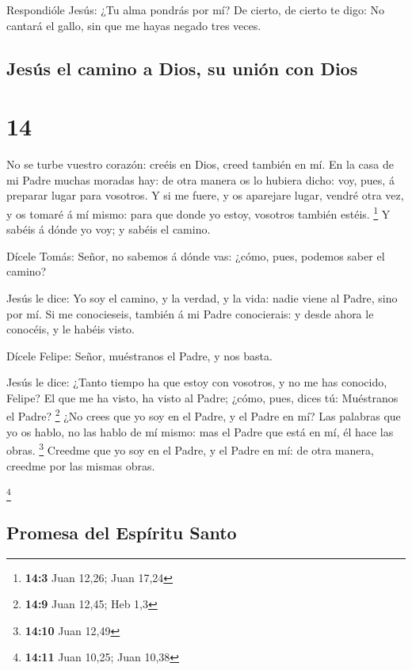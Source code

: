  Respondióle Jesús: ¿Tu alma pondrás por mí? De cierto, de
cierto te digo: No cantará el gallo, sin que me hayas negado tres veces.

\hypertarget{jesuxfas-el-camino-a-dios-su-uniuxf3n-con-dios}{%
\subsection{Jesús el camino a Dios, su unión con
Dios}\label{jesuxfas-el-camino-a-dios-su-uniuxf3n-con-dios}}

\hypertarget{section-13}{%
\section{14}\label{section-13}}

 No se turbe vuestro corazón: creéis en Dios, creed también
en mí.  En la casa de mi Padre muchas moradas hay: de otra
manera os lo hubiera dicho: voy, pues, á preparar lugar para vosotros.
 Y si me fuere, y os aparejare lugar, vendré otra vez, y os
tomaré á mí mismo: para que donde yo estoy, vosotros también estéis.
\footnote{\textbf{14:3} Juan 12,26; Juan 17,24}  Y sabéis á
dónde yo voy; y sabéis el camino.

 Dícele Tomás: Señor, no sabemos á dónde vas: ¿cómo, pues,
podemos saber el camino?

 Jesús le dice: Yo soy el camino, y la verdad, y la vida:
nadie viene al Padre, sino por mí.  Si me conocieseis,
también á mi Padre conocierais: y desde ahora le conocéis, y le habéis
visto.

 Dícele Felipe: Señor, muéstranos el Padre, y nos basta.

 Jesús le dice: ¿Tanto tiempo ha que estoy con vosotros, y
no me has conocido, Felipe? El que me ha visto, ha visto al Padre;
¿cómo, pues, dices tú: Muéstranos el Padre? \footnote{\textbf{14:9} Juan
  12,45; Heb 1,3}  ¿No crees que yo soy en el Padre, y el
Padre en mí? Las palabras que yo os hablo, no las hablo de mí mismo: mas
el Padre que está en mí, él hace las obras. \footnote{\textbf{14:10}
  Juan 12,49}  Creedme que yo soy en el Padre, y el Padre
en mí: de otra manera, creedme por las mismas obras.

\footnote{\textbf{14:11} Juan 10,25; Juan 10,38}

\hypertarget{promesa-del-espuxedritu-santo}{%
\subsection{Promesa del Espíritu
Santo}\label{promesa-del-espuxedritu-santo}}

